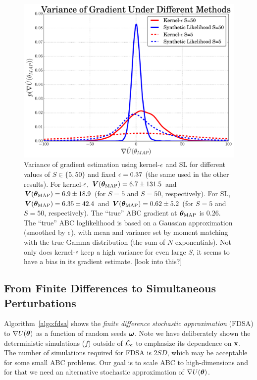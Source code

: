 \documentclass[]{article}
\begin{document}
\begin{figure}[t]
\vskip 0.2in
\begin{center}
\includegraphics[width=0.95\columnwidth]{./images/exp_varg_figure.pdf}
\caption{\small{Variance of gradient estimation using kernel-$\epsilon$ and SL for different values of $S\in\{5,50\}$ and fixed $\epsilon = 0.37$ (the same used in the other results).  For kernel-$\epsilon$, ${\bm V}({\bm \theta}_{\text{MAP}}) = 6.7 \pm 131.5$ and ${\bm V}({\bm \theta}_{\text{MAP}}) = 6.9 \pm 18.9$ (for $S=5$ and $S=50$, respectively).  For SL,${\bm V}({\bm \theta}_{\text{MAP}}) = 6.35 \pm 42.4$ and ${\bm V}({\bm \theta}_{\text{MAP}}) = 0.62 \pm 5.2$ (for $S=5$ and $S=50$, respectively).  The ``true'' ABC gradient at ${\bm \theta}_{\text{MAP}}$ is $0.26$.  The ``true'' ABC loglikelihood is based on a Gaussian approximation (smoothed by $\epsilon$), with mean and variance set by moment matching with the true Gamma distribution (the sum of $N$ exponentials). Not only does kernel-$\epsilon$ keep a high variance for even large $S$, it seems to have a bias in its gradient estimate.  [look into this?] }}
\label{fig:exp-varg}
\end{center}
\vskip -0.2in
\end{figure}

\subsection{From Finite Differences to Simultaneous Perturbations}


Algorithm~\ref{algo:fdsa} shows the {\em finite difference stochastic approximation} (FDSA) \cite{kiefer1952stochastic} to $\nabla U({\bm \theta})$ as a function of random seeds ${\bm \omega}$.  Note we have deliberately shown the deterministic simulations ($f$) outside of $\mathcal{L}_{{\bm {\epsilon}}}$ to emphasize its dependence on ${\bf x}$.  The number of simulations required for FDSA is $2 S D$, which may be acceptable for some small ABC problems.  Our goal is to scale ABC to high-dimensions and for that we need an alternative stochastic approximation of $\nabla U({\bm \theta})$.
\end{document}
